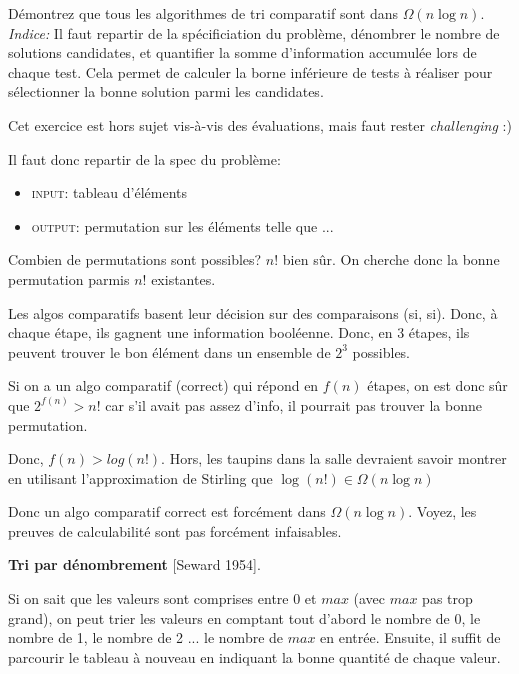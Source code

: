\documentclass[10pt]{article}\usepackage[correction]{esial}
\begin{document}
\Question Démontrez que tous les algorithmes de tri comparatif sont dans
$\Omega(n\log n)$. \\
\noindent \textit{Indice:} Il faut repartir de la spécificiation du problème,
dénombrer le nombre de solutions candidates, et quantifier la somme
d'information accumulée lors de chaque test. Cela permet de calculer la borne
inférieure de tests à réaliser pour sélectionner la bonne solution parmi les
candidates. 
\begin{Reponse}
  Cet exercice est hors sujet vis-à-vis des évaluations, mais faut rester
  \textit{challenging} :)

  Il faut donc repartir de la spec du problème:
  \begin{itemize}
  \item \textsc{input}: tableau d'éléments
  \item \textsc{output}: permutation sur les éléments telle que ...
  \end{itemize}

  Combien de permutations sont possibles? $n!$ bien sûr. On cherche donc la
  bonne permutation parmis $n!$ existantes.

  Les algos comparatifs basent leur décision sur des comparaisons (si,
  si). Donc, à chaque étape, ils gagnent une information booléenne. Donc, en 3
  étapes, ils peuvent trouver le bon élément dans un ensemble de $2^3$
  possibles.

  Si on a un algo comparatif (correct) qui répond en $f(n)$ étapes, on est donc
  sûr que $2^{f(n)}>n!$ car s'il avait pas assez d'info, il pourrait pas
  trouver la bonne permutation. 

  Donc, $f(n)>log(n!)$. Hors, les taupins dans la salle devraient savoir
  montrer en utilisant l'approximation de Stirling que 
  $\log(n!)\in\Omega(n\log n)$

  Donc un algo comparatif correct est forcément dans $\Omega(n\log n)$. Voyez,
  les preuves de calculabilité sont pas forcément infaisables.
\end{Reponse}

\Exercice \textbf{Tri par dénombrement} [Seward 1954].

Si on sait que les valeurs sont comprises entre 0 et $max$ (avec $max$
pas trop grand), on peut trier les valeurs en comptant tout d'abord le nombre
de 0, le nombre de 1, le nombre de 2 ... le nombre de $max$ en entrée. Ensuite,
il suffit de parcourir le tableau à nouveau en indiquant la bonne quantité de
chaque valeur.
\end{document}
